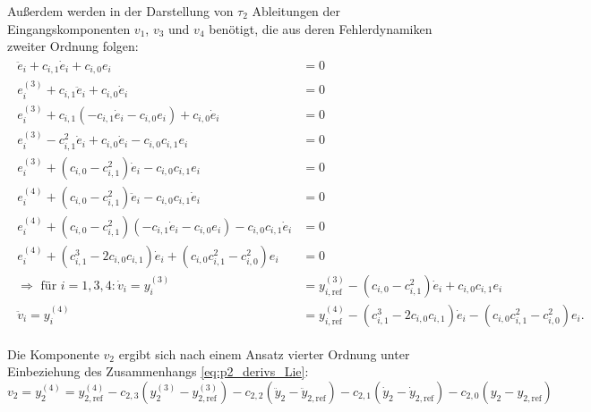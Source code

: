 Außerdem werden in der Darstellung von $\tau_2$ Ableitungen der Eingangskomponenten $v_1$, $v_3$ und $v_4$ benötigt, die aus deren Fehlerdynamiken zweiter Ordnung folgen:
\begin{align}
	\begin{split}
	    \ddot{e}_i + c_{i,1} \dot{e}_i + c_{i, 0} e_i &= 0 \\
		e_i^{(3)} + c_{i, 1} \ddot{e}_i + c_{i, 0} \dot{e}_i &= 0 \\
		e_i^{(3)} + c_{i, 1} (-c_{i, 1} \dot{e}_i - c_{i, 0} e_i) + c_{i, 0} \dot{e}_i &= 0 \\
		e_i^{(3)} - c_{i, 1}^2 \dot{e}_i + c_{i, 0} \dot{e}_i - c_{i, 0} c_{i, 1} e_i &= 0 \\
		e_i^{(3)} + (c_{i, 0} - c_{i, 1}^2) \dot{e}_i - c_{i, 0} c_{i, 1} e_i &= 0 \\
		e_i^{(4)} + (c_{i, 0} - c_{i, 1}^2) \ddot{e}_i - c_{i, 0} c_{i, 1} \dot{e}_i &= 0 \\
		e_i^{(4)} + (c_{i, 0} - c_{i, 1}^2) (-c_{i, 1} \dot{e}_i - c_{i, 0} e_i) - c_{i, 0} c_{i, 1} \dot{e}_i &= 0 \\
		e_i^{(4)} + (c_{i, 1}^3 - 2 c_{i, 0} c_{i, 1}) \dot{e}_i + (c_{i, 0} c_{i, 1}^2 - c_{i, 0}^2) e_i &= 0 \\
		\Rightarrow \text{ für } i = 1,3,4: \dot{v}_i = y_i^{(3)} &= y_{i, \text{ref}}^{(3)} - (c_{i, 0} - c_{i, 1}^2) \dot{e}_i + c_{i, 0} c_{i, 1} e_i \\
		\ddot{v}_i = y_i^{(4)} &= y_{i, \text{ref}}^{(4)} - (c_{i, 1}^3 - 2 c_{i, 0} c_{i, 1}) \dot{e}_i - (c_{i, 0} c_{i, 1}^2 - c_{i, 0}^2) e_i.
	\end{split}
\end{align}

Die Komponente $v_2$ ergibt sich nach einem Ansatz vierter Ordnung unter Einbeziehung des Zusammenhangs \eqref{eq:p2_derivs_Lie}:
\begin{equation}
	v_2 = y_2^{(4)} = y_{2, \text{ref}}^{(4)} - c_{2, 3} (y_2^{(3)} - y_{2, \text{ref}}^{(3)}) - c_{2, 2} (\ddot{y}_2 - \ddot{y}_{2, \text{ref}}) - c_{2, 1} (\dot{y}_2 - \dot{y}_{2, \text{ref}}) - c_{2, 0} (y_2 - y_{2, \text{ref}})
\end{equation} 

